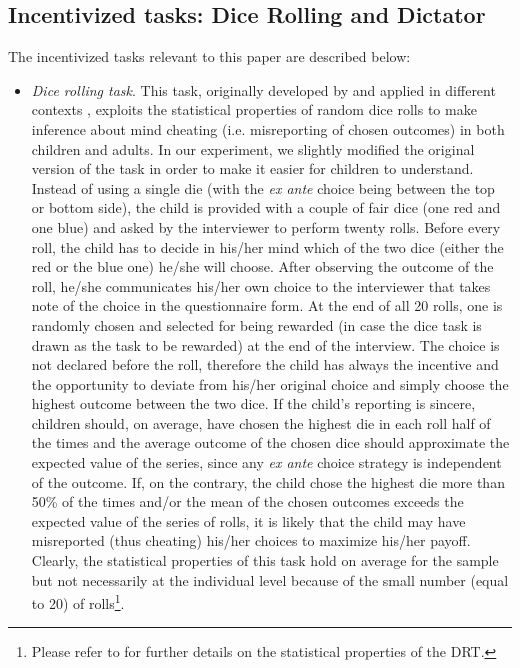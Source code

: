 \documentclass[authoryear, preprint, review, 12pt]{elsarticle}
\begin{document}
\subsection{Incentivized tasks: Dice Rolling and Dictator}
\label{subsec:IncTask}
The incentivized tasks relevant to this paper are described below:
\begin{itemize}
\item \textit{Dice rolling task}. This task, originally developed by \citet{ff13} and applied in different contexts \citep[e.g.][]{ariely2015true}, exploits the statistical properties of random dice rolls to make inference about mind cheating (i.e. misreporting of chosen outcomes) in both children and adults.
In our experiment, we slightly modified the original version of the task in order to make it easier for children to understand. Instead of using a single die (with the \textit{ex ante} choice being between the top or bottom side), the child is provided with a couple of fair dice (one red and one blue) and asked by the interviewer to perform twenty rolls. Before every roll, the child has to decide in his/her mind which of the two dice (either the red or the blue one) he/she will choose. After observing the outcome of the roll, he/she communicates his/her own choice to the interviewer that takes note of the choice in the questionnaire form. At the end of all 20 rolls, one is randomly chosen and selected for being rewarded (in case the dice task is drawn as the task to be rewarded) at the end of the interview. The choice is not declared before the roll, therefore the child has always the incentive and the opportunity to deviate from his/her original choice and simply choose the highest outcome between the two dice. If the child's reporting is sincere, children should, on average, have chosen the highest die in each roll half of the times and the average outcome of the chosen dice should approximate the expected value of the series, since any \textit{ex ante} choice strategy is independent of the outcome. If, on the contrary, the child chose the highest die more than 50\% of the times and/or the mean of the chosen outcomes exceeds the expected value of the series of rolls, it is likely that the child may have misreported (thus cheating) his/her choices to maximize his/her payoff. Clearly, the statistical properties of this task hold on average for the sample but not necessarily at the individual level because of the small number (equal to 20) of rolls\footnote{Please refer to \citet{ariely2015true} for further details on the statistical properties of the DRT.}.


\end{itemize}
\end{document}
